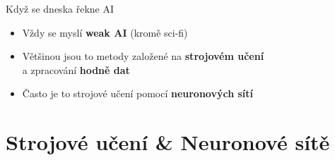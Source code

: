 \documentclass[handout,aspectratio=169,dvipsnames]{beamer}
\begin{document}

%
%
%
%


\begin{frame}{Když se dneska řekne AI}

    \Large

    \begin{itemize}[<+->]

        \item Vždy se myslí \textbf{weak AI} {\small (kromě sci-fi)} \\[1em]

        \item Většinou jsou to metody založené na \textbf{strojovém učení}  \\  \quad a zpracování
            \textbf{hodně dat} \\[1em]

        \item Často je to strojové učení pomocí \textbf{neuronových sítí}

    \end{itemize}


\end{frame}



\section[Strojové učení]{Strojové učení \& Neuronové sítě}
\end{document}
